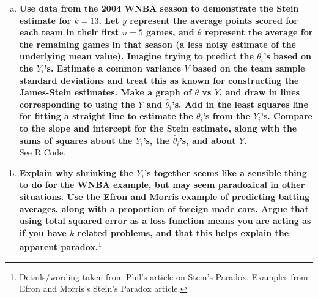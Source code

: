 \begin{enumerate}[a)]
    \item \textbf{Use data from the 2004 WNBA season to demonstrate the Stein estimate for $k = 13$.
    Let $y$ represent the average points scored for each team in their
    first $n = 5$ games, and $\theta$ represent the average for the remaining games in that season
    (a less noisy estimate of the underlying mean value). Imagine trying to predict the $\theta_i$'s based on the $Y_i$'s. 
    Estimate a common variance $V$ based on the team sample standard deviations and treat this as known for constructing the James-Stein estimates. Make a
    graph of $\theta$ vs $Y$, and draw in lines corresponding to using the $Y$ and $\hat{\theta}_i$'s. Add in the least squares line for fitting a straight line to estimate the $\theta_i$'s from the $Y_i$'s.
    Compare to the slope and intercept for the Stein estimate, along with the sums of squares about
    the $Y_i$'s, the $\hat{\theta}_i$'s, and about $\bar{Y}$.} \\

    See R Code. \\
    
    \item \textbf{Explain why shrinking the $Y_i$'s together seems like a sensible thing to do for the WNBA example, but may seem paradoxical in other situations. Use the Efron and Morris example of predicting batting averages, along with a proportion of foreign made cars. 
    Argue that using total squared error as a loss function means you are acting as if you have $k$
    related problems, and that this helps explain the apparent paradox.}\footnote{Details/wording taken from Phil's article on Stein's Paradox. Examples from Efron and Morris's Stein's Paradox article.} \\


\end{enumerate}
